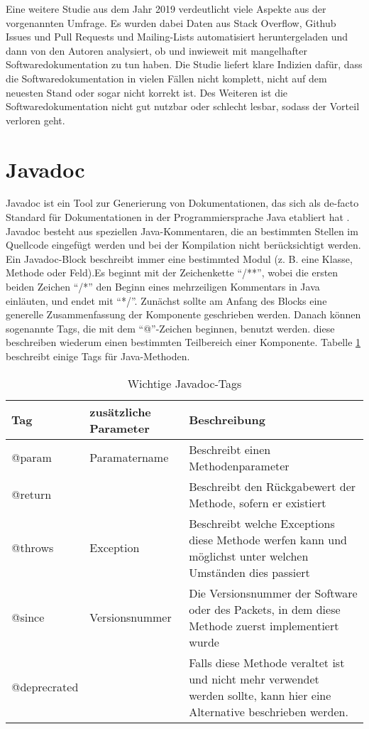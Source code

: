 Eine weitere Studie aus dem Jahr 2019 verdeutlicht viele Aspekte aus der vorgenannten Umfrage. Es wurden dabei Daten aus Stack Overflow, Github Issues und Pull Requests und Mailing-Lists automatisiert heruntergeladen und dann von den Autoren analysiert, ob und inwieweit mit mangelhafter Softwaredokumentation zu tun haben.  Die Studie liefert klare Indizien dafür, dass die Softwaredokumentation in vielen Fällen nicht komplett, nicht auf dem neuesten Stand oder sogar nicht korrekt ist. Des Weiteren ist die Softwaredokumentation nicht gut nutzbar oder schlecht lesbar, sodass der Vorteil verloren geht\cite[S.1201 -1204]{SoftwareDocumentationIssuesUnveiled}. 
\section{Javadoc}
Javadoc \cite{Javadoc} ist ein Tool zur Generierung von Dokumentationen, das sich als de-facto Standard für Dokumentationen in der Programmiersprache Java etabliert hat \cite[S. 249]{JavadocViolationsandTheirEvolutioninOpen-SourceSoftware}.  Javadoc besteht aus speziellen Java-Kommentaren, die an bestimmten Stellen im Quellcode eingefügt werden und bei der Kompilation nicht berücksichtigt werden. Ein Javadoc-Block beschreibt immer eine bestimmted Modul (z. B. eine Klasse, Methode oder Feld).Es beginnt mit der Zeichenkette \enquote{/**}, wobei die ersten beiden Zeichen \enquote{/*} den Beginn eines mehrzeiligen Kommentars in Java einläuten, und endet mit \enquote{*/}. Zunächst sollte am Anfang des Blocks eine generelle Zusammenfassung der Komponente geschrieben werden. Danach können sogenannte Tags, die mit dem \enquote{@}-Zeichen beginnen, benutzt werden. diese beschreiben wiederum einen bestimmten Teilbereich einer Komponente. Tabelle \ref{tab:table_javadoc_method} beschreibt einige Tags für Java-Methoden.
\begin{table}[h]
    \centering
    \begin{tabular}{m{4cm}|m{4cm}|m{7cm}}
    Tag & zusätzliche Parameter &Beschreibung\\
    \hline
        @param  & Paramatername & Beschreibt einen Methodenparameter\\
        \hline
         @return & & Beschreibt den Rückgabewert der Methode, sofern er existiert \\
         \hline
         @throws &Exception & Beschreibt welche Exceptions diese Methode werfen kann und möglichst unter welchen Umständen dies passiert \\
           \hline
         @since & Versionsnummer & Die Versionsnummer der Software oder des Packets, in dem diese Methode zuerst implementiert wurde\\
           \hline
         @deprecrated & & Falls diese Methode veraltet ist und nicht mehr verwendet werden sollte, kann hier eine Alternative beschrieben werden. \\
           \hline
         
           \hline
         
         
         
         
    \end{tabular}
    \caption{Wichtige Javadoc-Tags}
    \label{tab:table_javadoc_method}
\end{table}